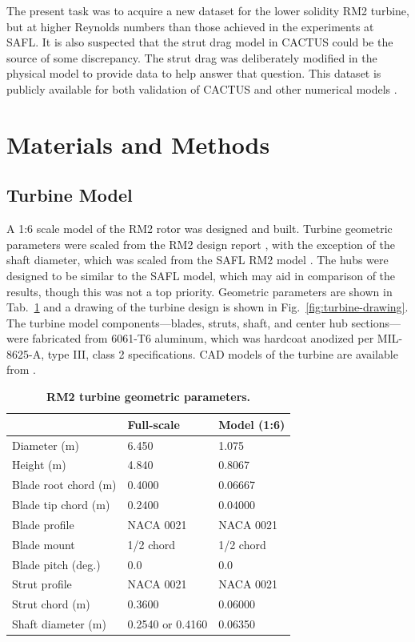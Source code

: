 \documentclass[10pt,letterpaper]{article}
\begin{document}
The present task was to acquire a new dataset for the lower solidity RM2
turbine, but at higher Reynolds numbers than those achieved in the experiments
at SAFL. It is also suspected that the strut drag model in CACTUS could be the
source of some discrepancy. The strut drag was deliberately modified in the
physical model to provide data to help answer that question. This dataset is
publicly available for both validation of CACTUS and other numerical models
\cite{Bachant2015-RM2-data}.


\section*{Materials and Methods}

\subsection*{Turbine Model}


A 1:6 scale model of the RM2 rotor was designed and built. Turbine geometric
parameters were scaled from the RM2 design report \cite{Barone2011},
with the exception of the shaft diameter, which was scaled from the SAFL RM2
model \cite{Hill2014}. The hubs were designed to be similar to the SAFL model,
which may aid in comparison of the results, though this was not a top priority.
Geometric parameters are shown in Tab.~\ref{tab:turb-geom} and a drawing of the
turbine design is shown in Fig.~\ref{fig:turbine-drawing}. The turbine model
components---blades, struts, shaft, and center hub sections---were fabricated
from 6061-T6 aluminum, which was hardcoat anodized per MIL-8625-A, type III,
class 2 specifications. CAD models of the turbine are available from
\cite{Bachant2015-RM2-CAD}.

\begin{table}[ht]
\centering
\begin{tabular}{l|l|l}
   & Full-scale & Model (1:6) \\
\hline
Diameter (m)   & 6.450 & 1.075 \\
Height (m)     & 4.840 & 0.8067 \\
Blade root chord (m) & 0.4000 & 0.06667 \\
Blade tip chord (m)  & 0.2400 & 0.04000 \\
Blade profile & NACA 0021 & NACA 0021 \\
Blade mount & 1/2 chord & 1/2 chord \\
Blade pitch (deg.) & 0.0 & 0.0 \\
Strut profile & NACA 0021 & NACA 0021 \\
Strut chord (m) & 0.3600 & 0.06000 \\
Shaft diameter (m) & 0.2540 \cite{Beam2011} or 0.4160 \cite{Hill2014} & 0.06350\\
\end{tabular}
\caption{\textbf{RM2 turbine geometric parameters.}}
\label{tab:turb-geom}
\end{table}
\end{document}
